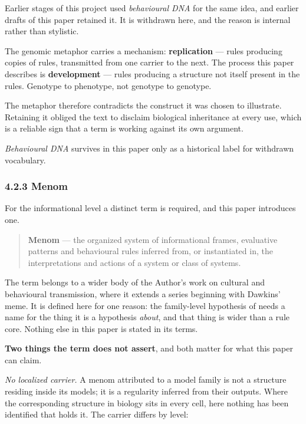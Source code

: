 Earlier stages of this project used \emph{behavioural DNA} for the same idea, and earlier drafts of this paper retained it. It is withdrawn here, and the reason is internal rather than stylistic.

The genomic metaphor carries a mechanism: \textbf{replication} — rules producing copies of rules, transmitted from one carrier to the next. The process this paper describes is \textbf{development} — rules producing a structure not itself present in the rules. Genotype to phenotype, not genotype to genotype.

The metaphor therefore contradicts the construct it was chosen to illustrate. Retaining it obliged the text to disclaim biological inheritance at every use, which is a reliable sign that a term is working against its own argument.

\emph{Behavioural DNA} survives in this paper only as a historical label for withdrawn vocabulary.


\subsubsection*{4.2.3 Menom}
\label{sec:en:4.2.3}

For the informational level a distinct term is required, and this paper introduces one.

\begin{quote}
\textbf{Menom} — the organized system of informational frames, evaluative patterns and behavioural rules inferred from, or instantiated in, the interpretations and actions of a system or class of systems.
\end{quote}
The term belongs to a wider body of the Author's work on cultural and behavioural transmission, where it extends a series beginning with Dawkins' meme. It is defined here for one reason: the family-level hypothesis of  needs a name for the thing it is a hypothesis \emph{about}, and that thing is wider than a rule core. Nothing else in this paper is stated in its terms.

\textbf{Two things the term does not assert}, and both matter for what this paper can claim.

\emph{No localized carrier.} A menom attributed to a model family is not a structure residing inside its models; it is a regularity inferred from their outputs. Where the corresponding structure in biology sits in every cell, here nothing has been identified that holds it. The carrier differs by level:

